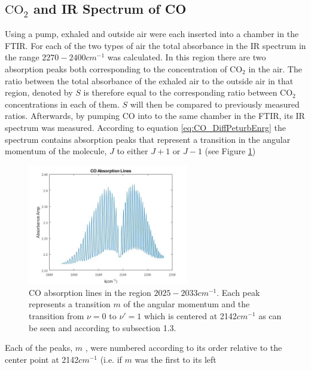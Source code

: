 \documentclass[reprint,amsmath,amssymb,aps, prl]{revtex4-2}
\begin{document}
\subsection{$\text{CO}_{2}$ and IR Spectrum of CO}
Using a pump, exhaled and outside air were each inserted into a chamber in the FTIR. For each of the two types of air the total absorbance in the IR spectrum in the range $2270-2400cm^{-1}$ was
calculated. In this region there are two absorption peaks both corresponding to the concentration of $\text{CO}_{2}$ in the air. The ratio between the total absorbance of the exhaled air to the outside air in that region, denoted by $S$ is therefore equal to the corresponding ratio between $\text{CO}_{2}$ concentrations in each of them. $S$ will then be compared to previously measured ratios. 
Afterwards, by pumping CO into to the same chamber in the FTIR, its IR spectrum was measured.
According to equation \ref{eq:CO_DiffPeturbEnrg}
the spectrum contains absorption peaks that represent a transition in the angular momentum of the molecule, $J$  to either $J+1$ or $J-1$ (see Figure \ref{fig:CoEnergy})
\begin{figure}[h]
    \includegraphics[width=7cm]{Images/COEnergystates.jpg}
    \caption{CO absorption lines in the region $2025-2033 cm^{-1}$. Each peak represents a transition $m$ of the angular momentum and the transition from $\nu=0$ to $\nu'=1$ which is centered at 2142$cm^{-1}$  as can be seen and according to subsection 1.3.
    }
    \label{fig:CoEnergy}
    \centering
\end{figure}
Each of the peaks, $m$ , were numbered according to its order relative to the center point at 2142$cm^{-1}$ (i.e. if $m$ was the first to its left
\end{document}
